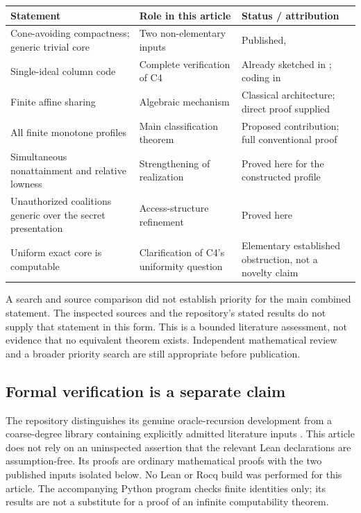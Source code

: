 \documentclass[11pt,letterpaper]{article}
\theoremstyle{plain}
\theoremstyle{definition}
\theoremstyle{remark}
\numberwithin{equation}{section}
\begin{document}
\begin{center}\small
\begin{tabularx}{\textwidth}{@{}p{}Xp{}@{}}
\toprule
Statement & Role in this article & Status / attribution\\
\midrule
Cone-avoiding compactness; generic trivial core & Two non-elementary inputs & Published, \cite{HJKS}\\
Single-ideal column code & Complete verification of C4 & Already sketched in \cite{RepoPlan}; coding in \cite{HJS}\\
Finite affine sharing & Algebraic mechanism & Classical architecture; direct proof supplied\\
All finite monotone profiles & Main classification theorem & Proposed contribution; full conventional proof\\
Simultaneous nonattainment and relative lowness & Strengthening of realization & Proved here for the constructed profile\\
Unauthorized coalitions generic over the secret presentation & Access-structure refinement & Proved here\\
Uniform exact core is computable & Clarification of C4's uniformity question & Elementary established obstruction, not a novelty claim\\
\bottomrule
\end{tabularx}
\end{center}

A search and source comparison did not establish priority for the main
combined statement. The inspected sources and the repository's stated
results do not supply that statement in this form. This is a bounded
literature assessment, not evidence that no equivalent theorem exists.
Independent mathematical review and a broader priority search are still
appropriate before publication.

\subsection{Formal verification is a separate claim}

The repository distinguishes its genuine oracle-recursion development from
a coarse-degree library containing explicitly admitted literature inputs
\cite{RepoReadme}. This article does not rely on an uninspected assertion
that the relevant Lean declarations are assumption-free. Its proofs are
ordinary mathematical proofs with the two published inputs isolated below.
No Lean or Rocq build was performed for this article. The accompanying
Python program checks finite identities only; its results are not a
substitute for a proof of an infinite computability theorem.
\end{document}

